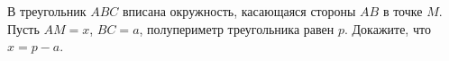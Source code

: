 \begin{ex}
	\begin{condition}
		В треугольник \( ABC  \) вписана окружность, касающаяся стороны \( AB  \) в точке \( M  \). Пусть \( AM = x \), \( BC = a \), полупериметр треугольника равен \( p \). Докажите, что \( x = p-a \).
	\end{condition}
\end{ex}